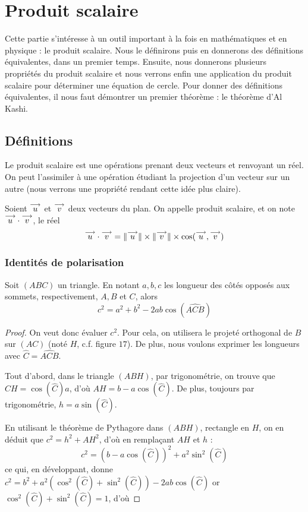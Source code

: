 \section{Produit scalaire}

Cette partie s'intéresse à un outil important à la fois en mathématiques et en physique : le produit scalaire. Nous le définirons puis en donnerons des définitions équivalentes, dans un premier temps. Ensuite, nous donnerons plusieurs propriétés du produit scalaire et nous verrons enfin une application du produit scalaire pour déterminer une équation de cercle. Pour donner des définitions équivalentes, il nous faut démontrer un premier théorème : le théorème d'Al Kashi.

\subsection{Définitions}

Le produit scalaire est une opérations prenant deux vecteurs et renvoyant un réel. On peut l'assimiler à une opération étudiant la projection d'un vecteur sur un autre (nous verrons une propriété rendant cette idée plus claire).

\begin{defi}
    Soient $\overset{\longrightarrow}{u}$ et $\overset{\longrightarrow}{v}$ deux vecteurs du plan. On appelle produit scalaire, et on note $\overset{\longrightarrow}{u} \cdot \overset{\longrightarrow}{v}$, le réel $$\overset{\longrightarrow}{u} \cdot \overset{\longrightarrow}{v} = \|\overset{\longrightarrow}{u}\|\times \|\overset{\longrightarrow}{v}\|\times \cos(\overset{\longrightarrow}{u},\overset{\longrightarrow}{v})$$
\end{defi}

\subsubsection{Identités de polarisation}

\begin{them}[Al-Kashi]
    Soit $(ABC)$ un triangle. En notant $a,b,c$ les longueur des côtés opposés aux sommets, respectivement, $A,B$ et $C$, alors $$c^2=a^2+b^2-2ab\cos(\widehat{ACB})$$
\end{them}


\begin{proof}
    On veut donc évaluer $c^2$. Pour cela, on utilisera le projeté orthogonal de $B$ sur $(AC)$ (noté $H$, c.f. figure $17$). De plus, nous voulons exprimer les longueurs avec $\hat C = \widehat{ACB}$.
    
    Tout d'abord, dans le triangle $(ABH)$, par trigonométrie, on trouve que $CH=\cos(\hat C)a$, d'où $AH=b-a\cos(\hat C)$. De plus, toujours par trigonométrie, $h=a\sin(\hat C)$.
    
    En utilisant le théorème de Pythagore dans $(ABH)$, rectangle en $H$, on en déduit que $c^2=h^2+AH^2$, d'où en remplaçant $AH$ et $h$ :
    $$c^2=(b-a\cos(\hat C))^2+a^2\sin^2(\hat C)$$
    ce qui, en développant, donne $c^2=b^2+a^2(\cos^2(\hat C)+\sin^2(\hat C))-2ab\cos(\hat C)$ or $\cos^2(\hat C)+\sin^2(\hat C)=1$, d'où 
\end{proof}

